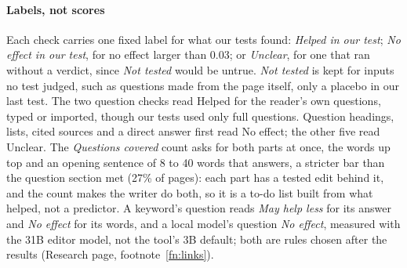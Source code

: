 \paragraph{Labels, not scores}\label{sec:labels}
Each check carries one fixed label for what our tests found: \emph{Helped in our test}; \emph{No effect in our test}, for no effect larger than 0.03; or \emph{Unclear}, for one that ran without a verdict, since \emph{Not tested} would be untrue.
\emph{Not tested} is kept for inputs no test judged, such as questions made from the page itself, only a placebo in our last test.
The two question checks read Helped for the reader's own questions, typed or imported, though our tests used only full questions.
Question headings, lists, cited sources and a direct answer first read No effect; the other five read Unclear.
The \emph{Questions covered} count asks for both parts at once, the words up top and an opening sentence of 8 to 40 words that answers, a stricter bar than the question section met (27\% of pages): each part has a tested edit behind it, and the count makes the writer do both, so it is a to-do list built from what helped, not a predictor.
A keyword's question reads \emph{May help less} for its answer and \emph{No effect} for its words, and a local model's question \emph{No effect}, measured with the 31B editor model, not the tool's 3B default; both are rules chosen after the results (Research page, footnote~\ref{fn:links}).

